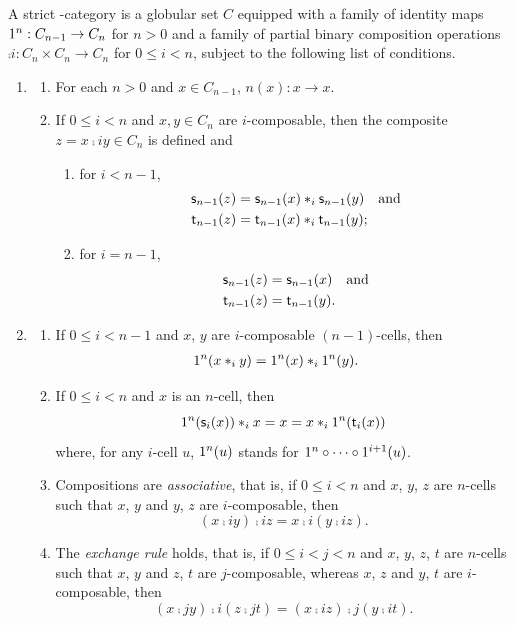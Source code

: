 \begin{definition}\label{def:oo-cat}
 A strict \oo-category  is a globular set $C$ equipped with a family of identity maps
$1^{n}:C_{n-1}\to C_n$ for $n>0$ and a family of partial binary composition operations  $\comp i:C_n\times C_n\to C_n$ for $0\leq i< n$, subject to the following list of conditions. 
\begin{enumerate}
\item
  \begin{enumerate}
  \item For each $n>0$ and $x\in C_{n-1}$, $\unit{n}(x): x\to x$.
  \item If $0\leq i<n$ and $x,y\in C_n$ are $i$-composable, then the composite $z=x\comp i y\in C_n$ is defined and
    \begin{enumerate}
    \item for $i<n-1$,
      \begin{align*}
        \mathsf{s}_{n-1}(z) & =\mathsf{s}_{n-1}(x)\ast_{i}\mathsf{s}_{n-1}(y)\quad \hbox{and}\\
        \mathsf{t}_{n-1}(z) & =\mathsf{t}_{n-1}(x)\ast_{i}\mathsf{t}_{n-1}(y) ;
      \end{align*}
    \item  for $i=n-1$,
      \begin{align*}
        \mathsf{s}_{n-1}(z) & =\mathsf{s}_{n-1}(x) \quad \hbox{and}\\
         \mathsf{t}_{n-1}(z) & =\mathsf{t}_{n-1}(y).
      \end{align*}
    \end{enumerate}
    \end{enumerate}
\item
  \begin{enumerate}
  \item If $0\leq i <n-1$ and $x$, $y$ are $i$-composable $(n{-}1)$-cells, then
    \begin{align*}
      1^{n}(x\ast_{i} y) & =1^{n}(x)\ast_{i} 1^{n}(y).
    \end{align*}
  \item If $0\leq i<n$ and $x$ is an $n$-cell, then
    \[1^{n}(\mathsf{s}_{i}(x))\ast_{i} x=x=x\ast_{i}1^{n}(\mathsf{t}_{i}(x))\]
    where, for any $i$-cell $u$, $1^{n}(u)$ stands for $1^{n}\circ\cdots\circ1^{i+1}(u)$.
  \item Compositions are {\em associative}, that is, if $0\leq i<n$ and $x$, $y$, $z$ are $n$-cells such that $x$, $y$ and $y$, $z$ are $i$-composable, then
    \[(x\comp i y)\comp i z=x\comp i (y\comp i z).\]
  \item The {\em exchange rule} holds, that is, if $0\leq i<j<n$ and $x$, $y$, $z$, $t$ are $n$-cells such that $x$, $y$ and $z$, $t$ are $j$-composable, whereas $x$, $z$ and $y$, $t$ are $i$-composable, then
    \[(x\comp j y)\comp i (z\comp j t)= (x\comp i z)\comp j (y\comp i t).\]
  \end{enumerate}
\end{enumerate}
\end{definition}

